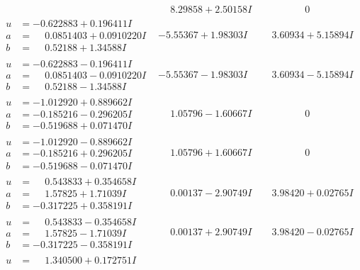 \documentclass[1p]{elsarticle_modified}
\theoremstyle{definition}
\begin{document}
$$\begin{array}{c|c|c}
 & \phantom{-}8.29858 + 2.50158 I & \phantom{-0.000000 } 0 \\ \hline\begin{aligned}
u &= -0.622883 + 0.196411 I \\
a &= \phantom{-}0.0851403 + 0.0910220 I \\
b &= \phantom{-}0.52188 + 1.34588 I\end{aligned}
 & -5.55367 + 1.98303 I & \phantom{-}3.60934 + 5.15894 I \\ \hline\begin{aligned}
u &= -0.622883 - 0.196411 I \\
a &= \phantom{-}0.0851403 - 0.0910220 I \\
b &= \phantom{-}0.52188 - 1.34588 I\end{aligned}
 & -5.55367 - 1.98303 I & \phantom{-}3.60934 - 5.15894 I \\ \hline\begin{aligned}
u &= -1.012920 + 0.889662 I \\
a &= -0.185216 - 0.296205 I \\
b &= -0.519688 + 0.071470 I\end{aligned}
 & \phantom{-}1.05796 - 1.60667 I & \phantom{-0.000000 } 0 \\ \hline\begin{aligned}
u &= -1.012920 - 0.889662 I \\
a &= -0.185216 + 0.296205 I \\
b &= -0.519688 - 0.071470 I\end{aligned}
 & \phantom{-}1.05796 + 1.60667 I & \phantom{-0.000000 } 0 \\ \hline\begin{aligned}
u &= \phantom{-}0.543833 + 0.354658 I \\
a &= \phantom{-}1.57825 + 1.71039 I \\
b &= -0.317225 + 0.358191 I\end{aligned}
 & \phantom{-}0.00137 - 2.90749 I & \phantom{-}3.98420 + 0.02765 I \\ \hline\begin{aligned}
u &= \phantom{-}0.543833 - 0.354658 I \\
a &= \phantom{-}1.57825 - 1.71039 I \\
b &= -0.317225 - 0.358191 I\end{aligned}
 & \phantom{-}0.00137 + 2.90749 I & \phantom{-}3.98420 - 0.02765 I \\ \hline\begin{aligned}
u &= \phantom{-}1.340500 + 0.172751 I \\

\end{aligned}
\end{array}$$
\end{document}
